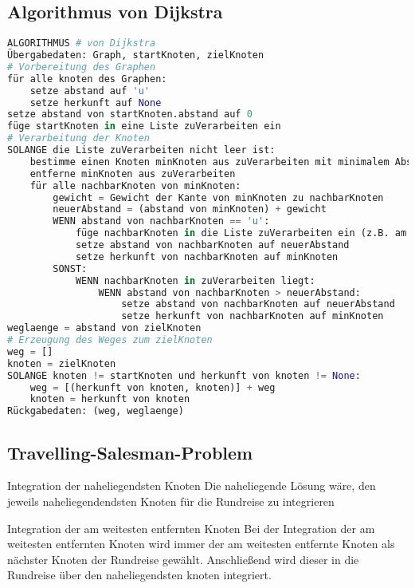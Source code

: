 \subsection{Algorithmus von Dijkstra}
\begin{lstlisting}[language=Python]
ALGORITHMUS # von Dijkstra
Übergabedaten: Graph, startKnoten, zielKnoten
# Vorbereitung des Graphen
für alle knoten des Graphen:
    setze abstand auf 'u'
    setze herkunft auf None
setze abstand von startKnoten.abstand auf 0
füge startKnoten in eine Liste zuVerarbeiten ein
# Verarbeitung der Knoten
SOLANGE die Liste zuVerarbeiten nicht leer ist:
    bestimme einen Knoten minKnoten aus zuVerarbeiten mit minimalem Abstand
    entferne minKnoten aus zuVerarbeiten
    für alle nachbarKnoten von minKnoten:
        gewicht = Gewicht der Kante von minKnoten zu nachbarKnoten
        neuerAbstand = (abstand von minKnoten) + gewicht
        WENN abstand von nachbarKnoten == 'u':
            füge nachbarKnoten in die Liste zuVerarbeiten ein (z.B. am Listenende)
            setze abstand von nachbarKnoten auf neuerAbstand
            setze herkunft von nachbarKnoten auf minKnoten
        SONST:
            WENN nachbarKnoten in zuVerarbeiten liegt:
                WENN abstand von nachbarKnoten > neuerAbstand:
                    setze abstand von nachbarKnoten auf neuerAbstand
                    setze herkunft von nachbarKnoten auf minKnoten
weglaenge = abstand von zielKnoten
# Erzeugung des Weges zum zielKnoten
weg = []
knoten = zielKnoten
SOLANGE knoten != startKnoten und herkunft von knoten != None:
    weg = [(herkunft von knoten, knoten)] + weg
    knoten = herkunft von knoten
Rückgabedaten: (weg, weglaenge)
\end{lstlisting}

\subsection{Travelling-Salesman-Problem}
\begin{zitat}{Integration der naheliegendsten Knoten}
Die naheliegende Lösung wäre, den jeweils naheliegendendsten Knoten für die Rundreise zu integrieren
\end{zitat}

\begin{zitat}{Integration der am weitesten entfernten Knoten}
Bei der Integration der am weitesten entfernten Knoten wird immer der am weitesten entfernte Knoten als nächster Knoten der Rundreise gewählt. Anschließend wird dieser in die Rundreise über den naheliegendsten knoten integriert.
\end{zitat}

 
